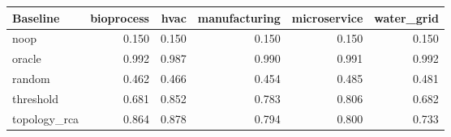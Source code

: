 \begin{tabular}{lrrrrr}
\toprule
Baseline & bioprocess & hvac & manufacturing & microservice & water\_grid \\
\midrule
noop & 0.150 & 0.150 & 0.150 & 0.150 & 0.150 \\
oracle & 0.992 & 0.987 & 0.990 & 0.991 & 0.992 \\
random & 0.462 & 0.466 & 0.454 & 0.485 & 0.481 \\
threshold & 0.681 & 0.852 & 0.783 & 0.806 & 0.682 \\
topology\_rca & 0.864 & 0.878 & 0.794 & 0.800 & 0.733 \\
\bottomrule
\end{tabular}
